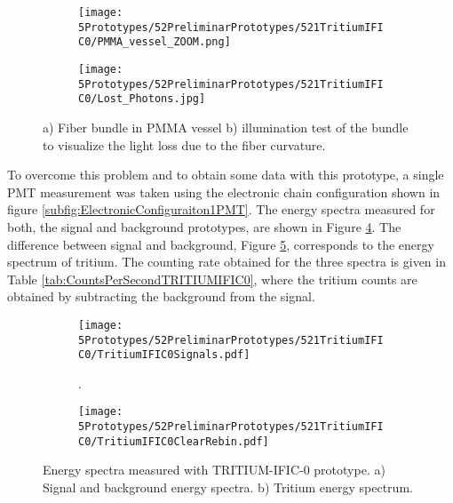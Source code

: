 \begin{figure}
\centering
    \begin{subfigure}[b]{0.45\textwidth}
    \centering
    \texttt{[image: 5Prototypes/52PreliminarPrototypes/521TritiumIFIC0/PMMA\_vessel\_ZOOM.png]}  
    \caption{\label{subfig:PMMAVesselToTestLostPhotons}}
    \end{subfigure}
    \hfill
    \begin{subfigure}[b]{0.45\textwidth}
    \centering
    \texttt{[image: 5Prototypes/52PreliminarPrototypes/521TritiumIFIC0/Lost\_Photons.jpg]}  
    \caption{\label{subfig:TestLostPhotons}}
    \end{subfigure}
 \caption{a) Fiber bundle in PMMA vessel b) illumination test of the bundle to visualize the light loss due to the fiber curvature.}
 \label{fig:TestLostPhotons}
\end{figure}

To overcome this problem and to obtain some data with this prototype, a single PMT measurement was taken using the electronic chain configuration shown in figure \ref{subfig:ElectronicConfiguraiton1PMT}. The energy spectra measured for both, the signal and background prototypes, are shown in Figure \ref{subfig:SignalBackgroundEnergySpectraTritiumIFIC0}. The difference between signal and background, Figure \ref{subfig:TritiumEnergySpectraTritiumIFIC0}, corresponds to the energy spectrum of tritium. The counting rate obtained for the three spectra is given in Table \ref{tab:CountsPerSecondTRITIUMIFIC0}, where the tritium counts are obtained by subtracting the background from the signal.


\begin{figure}
\centering
    \begin{subfigure}[b]{1\textwidth}
    \centering
    \texttt{[image: 5Prototypes/52PreliminarPrototypes/521TritiumIFIC0/TritiumIFIC0Signals.pdf]}  
    \caption{.\label{subfig:SignalBackgroundEnergySpectraTritiumIFIC0}}
    \end{subfigure}
    \hfill
    \begin{subfigure}[b]{1\textwidth}
    \centering
    \texttt{[image: 5Prototypes/52PreliminarPrototypes/521TritiumIFIC0/TritiumIFIC0ClearRebin.pdf]}  
    \caption{\label{subfig:TritiumEnergySpectraTritiumIFIC0}}
    \end{subfigure}
 \caption{Energy spectra measured with TRITIUM-IFIC-0 prototype. a) Signal and background energy spectra. b) Tritium energy spectrum.}
 \label{fig:EnergySpectraTRITIUMIFIC0}
\end{figure}


